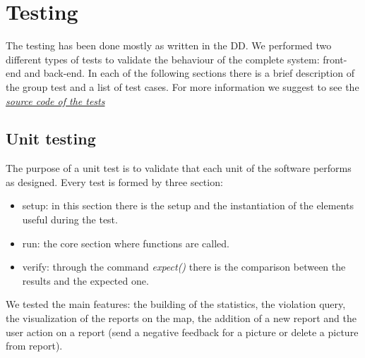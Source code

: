 \documentclass[../ITD.tex]{subfiles}
\begin{document}
    \chapter{Testing}\label{ch:testing}
    The testing has been done mostly as written in the DD. We performed two different types of tests to validate the behaviour of the complete system: front-end and back-end.
    In each of the following sections there is a brief description of the group test and a list of test cases.
    \newline For more information we suggest to see the \href{https://github.com/fedy97/MorrealeMaddesInnocente/tree/master/safe_streets/test}{\emph{source code of the tests}}
    \section{Unit testing}\label{sec:unit-testing}
    The purpose of a unit test is to validate that each unit of the software performs as designed.
    \newline Every test is formed by three section:
    \begin{itemize}
        \item setup: in this section there is the setup and the instantiation of the elements useful during the test.
        \item run: the core section where functions are called.
        \item verify: through the command \textit{expect()} there is the comparison between the results and the expected one.
    \end{itemize}
    We tested the main features: the building of the statistics, the violation query, the visualization of the reports on the map,
    the addition of a new report and the user action on a report (send a negative feedback for a picture or delete a picture from report).
\end{document}

